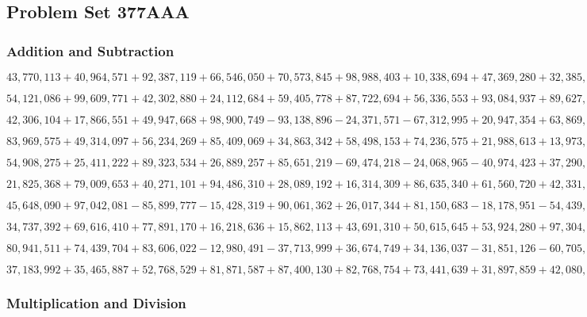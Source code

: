 \hypertarget{problem-set-377aaa}{%
\subsection{Problem Set 377AAA}\label{problem-set-377aaa}}

\hypertarget{addition-and-subtraction}{%
\subsubsection{Addition and
Subtraction}\label{addition-and-subtraction}}

\(43,770,113+40,964,571+92,387,119+66,546,050+70,573,845+98,988,403+10,338,694+47,369,280+32,385,869+50,299,233\)

\(54,121,086+99,609,771+42,302,880+24,112,684+59,405,778+87,722,694+56,336,553+93,084,937+89,627,320+44,186,151\)

\(42,306,104+17,866,551+49,947,668+98,900,749-93,138,896-24,371,571-67,312,995+20,947,354+63,869,405-44,742,326\)

\(83,969,575+49,314,097+56,234,269+85,409,069+34,863,342+58,498,153+74,236,575+21,988,613+13,973,297+58,142,255\)

\(54,908,275+25,411,222+89,323,534+26,889,257+85,651,219-69,474,218-24,068,965-40,974,423+37,290,018-31,084,941\)

\(21,825,368+79,009,653+40,271,101+94,486,310+28,089,192+16,314,309+86,635,340+61,560,720+42,331,400+85,492,420\)

\(45,648,090+97,042,081-85,899,777-15,428,319+90,061,362+26,017,344+81,150,683-18,178,951-54,439,360+96,023,989\)

\(34,737,392+69,616,410+77,891,170+16,218,636+15,862,113+43,691,310+50,615,645+53,924,280+97,304,134+60,619,424\)

\(80,941,511+74,439,704+83,606,022-12,980,491-37,713,999+36,674,749+34,136,037-31,851,126-60,705,676+32,960,303\)

\(37,183,992+35,465,887+52,768,529+81,871,587+87,400,130+82,768,754+73,441,639+31,897,859+42,080,000+95,348,353\)

\hypertarget{multiplication-and-division}{%
\subsubsection{Multiplication and
Division}\label{multiplication-and-division}}

